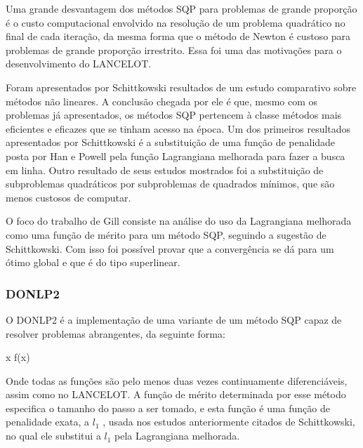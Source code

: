 Uma grande desvantagem dos métodos SQP para problemas de grande proporção é o custo computacional
envolvido na resolução de um problema quadrático no final de cada iteração, da mesma forma que
o método de Newton é custoso para problemas de grande proporção irrestrito. Essa foi uma das
motivações para o desenvolvimento do LANCELOT.

Foram apresentados por Schittkowski \cite{schittkowski1982nonlinear} resultados de um estudo
comparativo sobre métodos não lineares. A conclusão chegada por ele é que, mesmo com os problemas
já apresentados, os métodos SQP pertencem à classe métodos mais eficientes e eficazes que se tinham
acesso na época. Um dos primeiros resultados apresentados por Schittkowski é a substituição de uma
função de penalidade posta por Han e Powell pela função Lagrangiana melhorada para fazer a busca em linha.
Outro resultado de seus estudos mostrados foi a substituição de subproblemas quadráticos por
subproblemas de quadrados mínimos, que são menos custosos de computar.

O foco do trabalho de Gill \cite{gill1986some} consiste na análise do uso da Lagrangiana melhorada
como uma função de mérito para um método SQP, seguindo a sugestão de Schittkowski. Com isso foi
possível provar que a convergência se dá para um ótimo global e que é do tipo superlinear.



\subsubsection{DONLP2}
O DONLP2 é a implementação de uma variante de um método SQP capaz de resolver problemas 
abrangentes, da seguinte forma:

\vspace{-15pt}
\begin{mini!}
{x}{ f(x) \label{donl2_obj}}{\label{prob_donlp2}}{}
\end{mini!}

Onde todas as funções são pelo menos duas vezes continuamente diferenciáveis, assim como no
LANCELOT. A função de mérito determinada por esse método especifica o tamanho do passo a ser tomado,
e esta função é uma função de penalidade exata, a \( l_1 \) \cite{han1979exact}, usada nos estudos
anteriormente citados de Schittkowski, no qual ele substitui a \(l_1\) pela Lagrangiana melhorada.